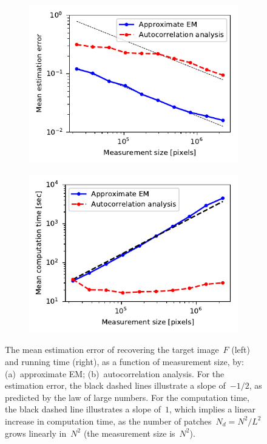 \documentclass{article}
\begin{document}
\begin{figure}[!tb]
	\begin{subfigure}[ht]{\columnwidth}
		\centering
		\includegraphics[width=0.85\columnwidth]{figures/experiment_size_err.pdf}
	\end{subfigure}
	\hfill
	\begin{subfigure}[ht]{\columnwidth}
		\centering
		\includegraphics[width=0.85\columnwidth]{figures/experiment_size_time.pdf}
	\end{subfigure}
	\caption{The mean estimation error of recovering the target image~$F$ (left) and running time (right), as a function of measurement size, by: (a)~approximate EM; (b)~autocorrelation analysis. For the estimation error, the black dashed lines illustrate a slope of~$-1/2$, as predicted by the law of large numbers. For the computation time, the black dashed line illustrates a slope of~$1$, which implies a linear increase in computation time, as the number of patches~\mbox{$N_d = N^2 / L^2$} grows linearly in~$N^2$ (the measurement size is~$N^2$).}
\label{fig:size_experiment}
\end{figure}
\end{document}
